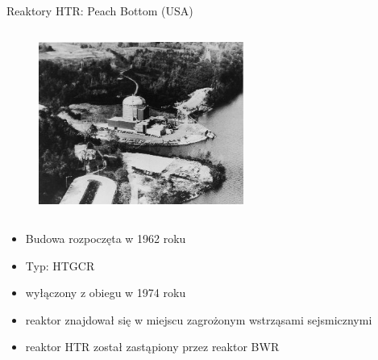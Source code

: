 \begin{columnframe}{Reaktory HTR: Peach Bottom (USA)}
    \begin{column}{0.5\textwidth}
        \begin{figure}
            \centering
            \includegraphics[width=0.6\textwidth, frame]{images/peach_bottom_aerial_view.jpg}
        \end{figure}
    \end{column}
    \begin{column}{0.5\textwidth}
        \begin{itemize}
            \item Budowa rozpoczęta w 1962 roku
            \item Typ: HTGCR
            \item wyłączony z obiegu w 1974 roku
            \item reaktor znajdował się w miejscu zagrożonym wstrząsami sejsmicznymi
            \item reaktor HTR został zastąpiony przez reaktor BWR
        \end{itemize}
    \end{column}
\end{columnframe}


